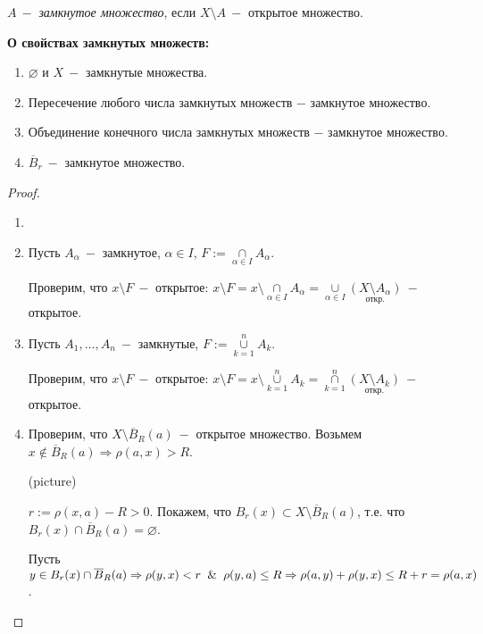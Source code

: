 \begin{definition}
    $A\ -$ \textit{замкнутое множество}, если $X\setminus A\ -$ открытое множество.
\end{definition}

\begin{theorem}
    \textbf{О свойствах замкнутых множеств:}
    \begin{enumerate}
        \item $\varnothing$ и $X\ -$ замкнутые множества.
        \item Пересечение любого числа замкнутых множеств $-$ замкнутое множество.
        \item Объединение конечного числа замкнутых множеств $-$ замкнутое множество.
        \item $\overline{B}_r\ -$ замкнутое множество.
    \end{enumerate}
\end{theorem}

\begin{proof}
    \begin{enumerate}
        \item[]
        \item Пусть $A_\alpha\ -$ замкнутое, $\alpha\in I$, $F:=\cap\limits_{\alpha\in I}A_\alpha$.

        Проверим, что $x\setminus F\ -$ открытое: $x\setminus F=x\setminus \cap\limits_{\alpha\in I}A_\alpha=\cup\limits_{\alpha\in I}\underset{\text{откр.}}{(X\setminus A_\alpha)}\ -$ открытое.
        \item Пусть $A_1,...,A_n\ -$ замкнутые, $F:=\cup\limits_{k=1}^nA_k$.

        Проверим, что $x\setminus F\ -$ открытое: $x\setminus F=x\setminus \cup\limits_{k=1}^nA_k=\cap\limits_{k=1}^n\underset{\text{откр.}}{(X\setminus A_k)}\ -$ открытое.
        \item Проверим, что $X\setminus \overline{B}_R(a)\ -$ открытое множество. Возьмем $x\notin \overline{B}_R(a)\Rightarrow \rho (a,x)>R$.

        (picture)

        $r:=\rho(x,a)-R>0$. Покажем, что $B_r(x)\subset X\setminus \overline{B}_R(a)$, т.е. что $B_r(x)\cap \overline{B}_R(a) =\varnothing$.

        Пусть $y\in B_r(x)\cap \overline{B}_R(a)\Rightarrow \rho(y,x)<r\And\rho(y, a)\leq R\Rightarrow \rho(a,y)+\rho(y,x)\leq R+r=\rho(a,x)$.
    \end{enumerate}
\end{proof}

